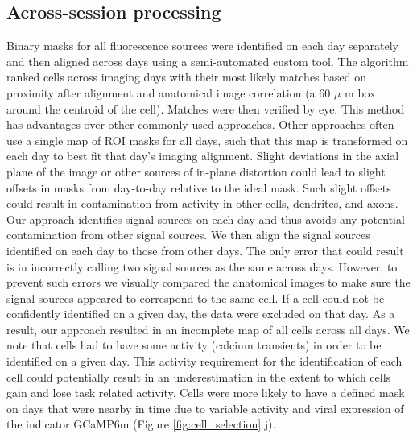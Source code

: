  \subsection{Across-session processing}\label{methods:across days}
Binary masks for all fluorescence sources were identified on each day separately and then aligned across days using a semi-automated custom tool. The algorithm ranked cells across imaging days with their most likely matches based on proximity after alignment and anatomical image correlation (a 60 $\mu$ m box around the centroid of the cell). Matches were then verified by eye. This method has advantages over other commonly used approaches. Other approaches often use a single map of ROI masks for all days, such that this map is transformed on each day to best fit that day's imaging alignment. Slight deviations in the axial plane of the image or other sources of in-plane distortion could lead to slight offsets in masks from day-to-day relative to the ideal mask. Such slight offsets could result in contamination from activity in other cells, dendrites, and axons. Our approach identifies signal sources on each day and thus avoids any potential contamination from other signal sources. We then align the signal sources identified on each day to those from other days. The only error that could result is in incorrectly calling two signal sources as the same across days. However, to prevent such errors we visually compared the anatomical images to make sure the signal sources appeared to correspond to the same cell. If a cell could not be confidently identified on a given day, the data were excluded on that day. As a result, our approach resulted in an incomplete map of all cells across all days. We note that cells had to have some activity (calcium transients) in order to be identified on a given day. This activity requirement for the identification of each cell could potentially result in an underestimation in the extent to which cells gain and lose task related activity. Cells were more likely to have a defined mask on days that were nearby in time due to variable activity and viral expression of the indicator GCaMP6m (Figure \ref{fig:cell_selection} j). 

